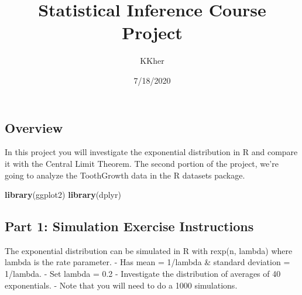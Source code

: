 \documentclass[]{article}
\title{Statistical Inference Course Project}
\author{KKher}
\date{7/18/2020}
\newenvironment{Shaded}{\begin{snugshade}}{\end{snugshade}}
\newcommand{\KeywordTok}[1]{\textcolor[rgb]{0.13,0.29,0.53}{\textbf{#1}}}
\newcommand{\NormalTok}[1]{#1}
\begin{document}
\maketitle

\hypertarget{overview}{%
\subsection{Overview}\label{overview}}

In this project you will investigate the exponential distribution in R
and compare it with the Central Limit Theorem. The second portion of the
project, we're going to analyze the ToothGrowth data in the R datasets
package.

\begin{Shaded}
\begin{Highlighting}[]
\KeywordTok{library}\NormalTok{(ggplot2)}
\KeywordTok{library}\NormalTok{(dplyr)}
\end{Highlighting}
\end{Shaded}

\hypertarget{part-1-simulation-exercise-instructions}{%
\subsection{Part 1: Simulation Exercise
Instructions}\label{part-1-simulation-exercise-instructions}}

The exponential distribution can be simulated in R with rexp(n, lambda)
where lambda is the rate parameter. - Has mean = 1/lambda \& standard
deviation = 1/lambda. - Set lambda = 0.2 - Investigate the distribution
of averages of 40 exponentials. - Note that you will need to do a 1000
simulations.
\end{document}
